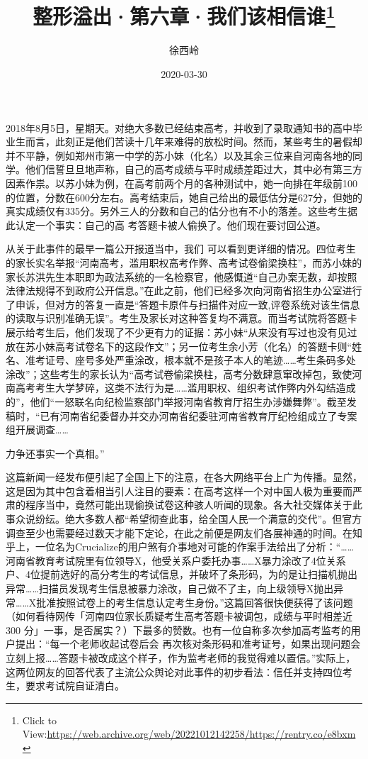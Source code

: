 \documentclass{article}
\title{整形溢出·第六章·我们该相信谁\footnote{Click to View:\url{https://web.archive.org/web/20221012142258/https://rentry.co/e8bxm}}}
\author{徐西岭}
\date{2020-03-30}
\begin{document}

\maketitle


\Large

﻿2018年8⽉5⽇，星期天。对绝⼤多数已经结束⾼考，并收到了录取通知书的⾼中毕业⽣⽽⾔，此刻正是他们苦读⼗⼏年来难得的放松时间。然⽽，某些考⽣的暑假却并不平静，例如郑州市第⼀中学的苏⼩妹（化名）以及其余三位来⾃河南各地的同学。他们信誓旦旦地声称，⾃⼰的⾼考成绩与平时成绩差距过⼤，其中必有第三⽅因素作祟。以苏⼩妹为例，在⾼考前两个⽉的各种测试中，她⼀向排在年级前100的位置，分数在600分左右。⾼考结束后，她⾃⼰给出的最低估分是627分，但她的真实成绩仅有335分。另外三⼈的分数和⾃⼰的估分也有不⼩的落差。这些考⽣据此认定⼀个事实：⾃⼰的⾼
考答题卡被⼈偷换了。他们现在要讨回公道。 

从关于此事件的最早⼀篇公开报道当中，我们
\newpage
可以看到更详细的情况。四位考⽣的家长实名举报“河南⾼考，滥⽤职权⾼考作弊、⾼考试卷偷梁换柱”，⽽苏⼩妹的家长苏洪先⽣本职即为政法系统的⼀名检察官，他感慨道“⾃⼰办案⽆数，却按照法律法规得不到政府公开信息。”在此之前，他们已经多次向河南省招⽣办公室进⾏了申诉，但对⽅的答复⼀直是“答题卡原件与扫描件对应⼀致,评卷系统对该⽣信息的读取与识别准确⽆误”。考⽣及家长对这种答复均不满意。⽽当考试院将答题卡展⽰给考⽣后，他们发现了不少更有⼒的证据：苏⼩妹“从来没有写过也没有见过放在苏⼩妹⾼考试卷名下的这段作⽂”；另⼀位考⽣余⼩芳（化名）的答题卡则“姓名、准考证号、座号多处严重涂改，根本就不是孩⼦本⼈的笔迹……考⽣条码多处涂改”；这些考⽣的家长认为“⾼考试卷偷梁换柱，⾼考分数肆意窜改掉包，致使河南⾼考考⽣⼤学梦碎，这类不法⾏为是……滥⽤职权、组织考试作弊内外勾结造成的”，他们“⼀怒联名向纪检监察部门举报河南省教育厅招⽣办涉嫌舞弊”。截⾄发稿时，“已有河南省纪委督办并交办河南省纪委驻河南省教育厅纪检组成⽴了专案组开展调查……

\newpage
⼒争还事实⼀个真相。” 

这篇新闻⼀经发布便引起了全国上下的注意，在各⼤⽹络平台上⼴为传播。显然，这是因为其中包含着相当引⼈注⽬的要素：在⾼考这样⼀个对中国⼈极为重要⽽严肃的程序当中，竟然可能出现偷换试卷这种骇⼈听闻的现象。各⼤社交媒体关于此事众说纷纭。绝⼤多数⼈都“希望彻查此事，给全国⼈民⼀个满意的交代”。但官⽅调查⾄少也需要经过数天才能下定论，在此之前便是⽹友们各展神通的时间。在知乎上，⼀位名为Crucialize的⽤户煞有介事地对可能的作案⼿法给出了分析：“……河南省教育考试院⾥有位领导X，他受关系户委托办事……X暴⼒涂改了4位关系户、4位提前选好的⾼分考⽣的考试信息，并破坏了条形码，为的是让扫描机抛出异常……扫描员发现考⽣信息被暴⼒涂改，⾃⼰做不了主，向上级领导X抛出异常……X批准按照试卷上的考⽣信息认定考⽣⾝份。”这篇回答很快便获得了该问题（如何看待⽹传「河南四位家长质疑考⽣⾼考答题卡被调包，成绩与平时相差近 300 分」⼀事，是否属实？）下最多的赞数。也有⼀位⾃称多次参加⾼考监考的⽤户提出：“每⼀个⽼师收起试卷后会
\newpage
再次核对条形码和准考证号，如果出现问题会⽴刻上报……答题卡被改成这个样⼦，作为监考⽼师的我觉得难以置信。”实际上，这两位⽹友的回答代表了主流公众舆论对此事件的初步看法：信任并⽀持四位考
⽣，要求考试院⾃证清⽩。 
\end{document}

